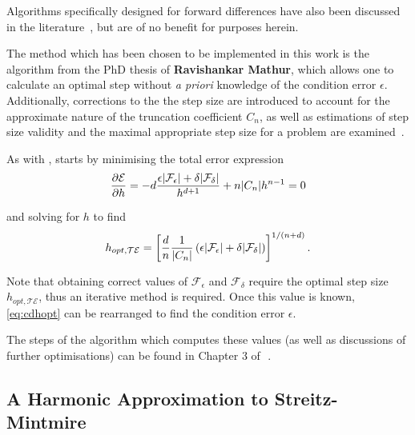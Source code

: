 Algorithms specifically designed for forward differences have also been discussed in the literature~\cite{Barton1992}, but are of no benefit for purposes herein.

The method which has been chosen to be implemented in this work is the algorithm from the PhD thesis of \textbf{Ravishankar Mathur}, which allows one to calculate an optimal step without \emph{a priori} knowledge of the condition error $\epsilon$.
Additionally, corrections to the the step size are introduced to account for the approximate nature of the truncation coefficient $C_n$, as well as estimations of step size validity and the maximal appropriate step size for a problem are examined~\cite{Mathur2012}.

As with \citeauthor{Gill1982}, \citeauthor{Mathur2012} starts by minimising the total error expression
\begin{equation}
\frac{\partial\mathcal{E}}{\partial h} = -d\frac{\epsilon\lvert\mathcal{F}_\epsilon\rvert+\delta\lvert\mathcal{F}_\delta\rvert}{h^{d+1}} + n\lvert C_n\rvert h^{n-1} = 0
\end{equation}

and solving for $h$ to find
\begin{equation}
h_{opt,\mathcal{TE}} = \left[\frac{d}{n}\frac{1}{\lvert C_n\rvert}\left(\epsilon\lvert\mathcal{F}_\epsilon\rvert+
\delta\lvert\mathcal{F}_\delta\rvert\right)\right]^{1/(n+d)}.\label{eq:cdhopt}
\end{equation}

Note that obtaining correct values of $\mathcal{F}_\epsilon$ and $\mathcal{F}_\delta$ require the optimal step size $h_{opt,\mathcal{TE}}$, thus an iterative method is required.
Once this value is known, \cref{eq:cdhopt} can be rearranged to find the condition error $\epsilon$.

The steps of the algorithm which computes these values (as well as discussions of further optimisations) can be found in Chapter 3 of~\,.

\subsection{A Harmonic Approximation to Streitz-Mintmire}\label{subsec:harmsm}

